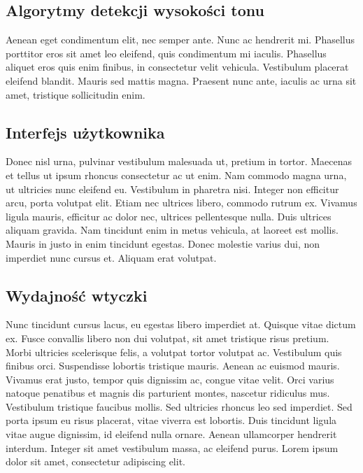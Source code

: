 \subsection{Algorytmy detekcji wysokości tonu}
\begin{spacing}{1.5} %
    Aenean eget condimentum elit, nec semper ante. Nunc ac hendrerit mi. Phasellus porttitor eros sit amet leo eleifend, quis condimentum mi iaculis. Phasellus aliquet eros quis enim finibus, in consectetur velit vehicula. Vestibulum placerat eleifend blandit. Mauris sed mattis magna. Praesent nunc ante, iaculis ac urna sit amet, tristique sollicitudin enim. 
\end{spacing} %

\subsection{Interfejs użytkownika}
\begin{spacing}{1.5} %
    Donec nisl urna, pulvinar vestibulum malesuada ut, pretium in tortor. Maecenas et tellus ut ipsum rhoncus consectetur ac ut enim. Nam commodo magna urna, ut ultricies nunc eleifend eu. Vestibulum in pharetra nisi. Integer non efficitur arcu, porta volutpat elit. Etiam nec ultrices libero, commodo rutrum ex. Vivamus ligula mauris, efficitur ac dolor nec, ultrices pellentesque nulla. Duis ultrices aliquam gravida. Nam tincidunt enim in metus vehicula, at laoreet est mollis. Mauris in justo in enim tincidunt egestas. Donec molestie varius dui, non imperdiet nunc cursus et. Aliquam erat volutpat. 
\end{spacing} %

\subsection{Wydajność wtyczki}
\begin{spacing}{1.5} %
    Nunc tincidunt cursus lacus, eu egestas libero imperdiet at. Quisque vitae dictum ex. Fusce convallis libero non dui volutpat, sit amet tristique risus pretium. Morbi ultricies scelerisque felis, a volutpat tortor volutpat ac. Vestibulum quis finibus orci. Suspendisse lobortis tristique mauris. Aenean ac euismod mauris. Vivamus erat justo, tempor quis dignissim ac, congue vitae velit. Orci varius natoque penatibus et magnis dis parturient montes, nascetur ridiculus mus. Vestibulum tristique faucibus mollis. Sed ultricies rhoncus leo sed imperdiet. Sed porta ipsum eu risus placerat, vitae viverra est lobortis. Duis tincidunt ligula vitae augue dignissim, id eleifend nulla ornare. Aenean ullamcorper hendrerit interdum. Integer sit amet vestibulum massa, ac eleifend purus. Lorem ipsum dolor sit amet, consectetur adipiscing elit. 
\end{spacing} %

